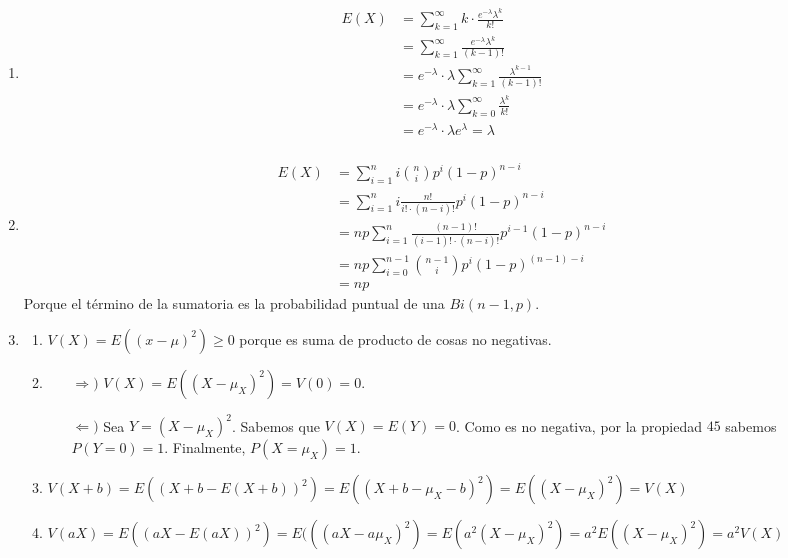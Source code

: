 \begin{enumerate}
	\item
		\begin{align*}
			E(X)	& = \sum_{k=1}^{\infty}k\cdot \frac{e^{-\lambda}\lambda^{k}}{k!}				\\
					& = \sum_{k=1}^{\infty}\frac{e^{-\lambda}\lambda^{k}}{(k-1)!}					\\
					& = e^{-\lambda}\cdot\lambda \sum_{k=1}^{\infty}\frac{\lambda^{k-1}}{(k-1)!}	\\
					& = e^{-\lambda}\cdot\lambda \sum_{k=0}^{\infty}\frac{\lambda^{k}}{k!}			\\
					& = e^{-\lambda}\cdot\lambda e^{\lambda} = \lambda			\\
		\end{align*}
		
	\item
		\begin{align*}
			E(X)	& = \sum_{i=1}^n i\binom{n}{i}p^i(1-p)^{n-i}							\\
					& = \sum_{i=1}^n i\frac{n!}{i!\cdot (n-i)!}p^i(1-p)^{n-i}				\\
					& = np \sum_{i=1}^n \frac{(n-1)!}{(i-1)!\cdot (n-i)!}p^{i-1}(1-p)^{n-i}	\\
					& = np \sum_{i=0}^{n-1} \binom{n-1}{i}p^{i}(1-p)^{(n-1)-i}				\\
					& = np
		\end{align*}
		Porque el término de la sumatoria es la probabilidad puntual de una $Bi(n-1, p)$.
		
	\item
		\begin{enumerate}
			\item $V(X) = E((x-\mu)^2) \geq 0$ porque es suma de producto de cosas no negativas.
			\item
				\begin{itemize}
					\item[$\Rightarrow)$] $V(X) = E((X-\mu_X)^2) = V(0) = 0$.
					\item[$\Leftarrow)$] Sea $Y = (X - \mu_X)^2$. Sabemos que $V(X) = E(Y) = 0$.
						Como es no negativa, por la propiedad $45$ sabemos $P(Y=0) = 1$.
						Finalmente, $P(X=\mu_X) = 1$.
				\end{itemize}
			\item $V(X+b) = E((X+b-E(X+b))^2) = E((X+b-\mu_X - b)^2) = E((X-\mu_X)^2) = V(X)$
			\item $V(aX) = E((aX - E(aX))^2) = E(((aX - a\mu_X)^2) = E(a^2(X-\mu_X)^2) = a^2E((X-\mu_X)^2) = a^2V(X)$
		\end{enumerate}
	

\end{enumerate}
